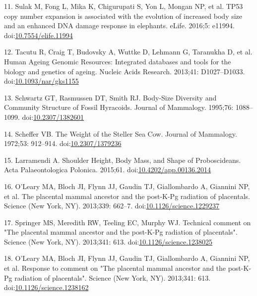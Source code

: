 \documentclass[10pt,letterpaper]{article}
\begin{document}
\leavevmode\hypertarget{ref-Sulak2016}{}%
11. Sulak M, Fong L, Mika K, Chigurupati S, Yon L, Mongan NP, et al.
TP53 copy number expansion is associated with the evolution of increased
body size and an enhanced DNA damage response in elephants. eLife.
2016;5: e11994.
doi:\href{https://doi.org/10.7554/elife.11994}{10.7554/elife.11994}

\leavevmode\hypertarget{ref-HAGR}{}%
12. Tacutu R, Craig T, Budovsky A, Wuttke D, Lehmann G, Taranukha D, et
al. Human Ageing Genomic Resources: Integrated databases and tools for
the biology and genetics of ageing. Nucleic Acids Research. 2013;41:
D1027--D1033.
doi:\href{https://doi.org/10.1093/nar/gks1155}{10.1093/nar/gks1155}

\leavevmode\hypertarget{ref-Schwartz1995}{}%
13. Schwartz GT, Rasmussen DT, Smith RJ. Body-Size Diversity and
Community Structure of Fossil Hyracoids. Journal of Mammalogy. 1995;76:
1088--1099. doi:\href{https://doi.org/10.2307/1382601}{10.2307/1382601}

\leavevmode\hypertarget{ref-Scheffer1972}{}%
14. Scheffer VB. The Weight of the Steller Sea Cow. Journal of
Mammalogy. 1972;53: 912--914.
doi:\href{https://doi.org/10.2307/1379236}{10.2307/1379236}

\leavevmode\hypertarget{ref-Larramendi:20151c2}{}%
15. Larramendi A. Shoulder Height, Body Mass, and Shape of
Proboscideans. Acta Palaeontologica Polonica. 2015;61.
doi:\href{https://doi.org/10.4202/app.00136.2014}{10.4202/app.00136.2014}

\leavevmode\hypertarget{ref-OLeary2013a}{}%
16. O'Leary MA, Bloch JI, Flynn JJ, Gaudin TJ, Giallombardo A, Giannini
NP, et al. The placental mammal ancestor and the post-K-Pg radiation of
placentals. Science (New York, NY). 2013;339: 662--7.
doi:\href{https://doi.org/10.1126/science.1229237}{10.1126/science.1229237}

\leavevmode\hypertarget{ref-Springer2013}{}%
17. Springer MS, Meredith RW, Teeling EC, Murphy WJ. Technical comment
on "The placental mammal ancestor and the post-K-Pg radiation of
placentals". Science (New York, NY). 2013;341: 613.
doi:\href{https://doi.org/10.1126/science.1238025}{10.1126/science.1238025}

\leavevmode\hypertarget{ref-OLeary2013b}{}%
18. O'Leary MA, Bloch JI, Flynn JJ, Gaudin TJ, Giallombardo A, Giannini
NP, et al. Response to comment on "The placental mammal ancestor and the
post-K-Pg radiation of placentals". Science (New York, NY). 2013;341:
613.
doi:\href{https://doi.org/10.1126/science.1238162}{10.1126/science.1238162}
\end{document}
